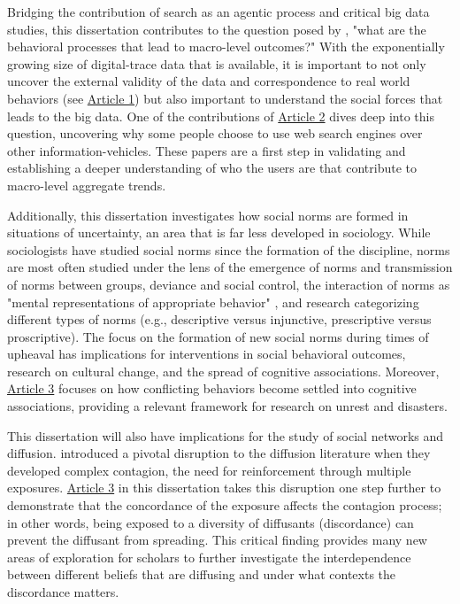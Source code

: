 Bridging the contribution of search as an agentic process 
and critical big data studies, this dissertation contributes to the question posed by 
\citet{breigerScaling2015}, "what are the behavioral processes that 
lead to macro-level outcomes?" With the exponentially growing size of digital-trace data
that is available, it is important to not only uncover the external validity of 
the data and correspondence to real world behaviors (see \hyperlink{paper-1}{Article 1})
but also important to understand the social forces that leads to the big data. 
One of the contributions of \hyperlink{paper-2}{Article 2} dives deep
into this question, uncovering why some people choose to use web search engines over other
information-vehicles. These papers are a first step in validating and establishing
a deeper understanding of who the users are that contribute to macro-level aggregate trends. 

Additionally, this dissertation investigates how social norms are
formed in situations of uncertainty, an area that is far less developed in
sociology. While sociologists have studied social norms since the
formation of the discipline, norms are most often studied under the lens
of the emergence of norms and transmission of norms between groups, 
deviance and social control, the interaction of norms as "mental 
representations of appropriate behavior" \citep{aarts2003silence}, 
and research categorizing different types of norms (e.g., descriptive 
versus injunctive, prescriptive versus proscriptive).  
The focus on the formation of new social norms during times of upheaval 
has implications for interventions in social behavioral outcomes, 
research on cultural change, and the spread of cognitive associations. 
Moreover, \hyperlink{paper-3}{Article 3} focuses on how conflicting
behaviors become settled into cognitive associations, providing
a relevant framework for research on unrest and disasters.

This dissertation will also have implications for the study of social
networks and diffusion. \citet{centolaComplexContagionsWeakness2007}
introduced a pivotal disruption to the diffusion literature when
they developed complex contagion, the need for reinforcement through multiple
exposures.  \hyperlink{paper-3}{Article 3} in this dissertation
takes this disruption one step further to demonstrate that the concordance
of the exposure affects the contagion process; in other words, being exposed to a 
diversity of diffusants (discordance) can prevent the diffusant from spreading. 
This critical finding provides many new areas of exploration for scholars 
to further investigate the interdependence between different beliefs that
are diffusing and under what contexts the discordance matters. 

